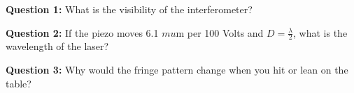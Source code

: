 \textbf{Question 1:}
	\indent What is the visibility of the interferometer?
	
\textbf{Question 2:}
	\indent If the piezo moves 6.1 $mu$m per 100 Volts and $D=\frac{\lambda}{2}$, what is the wavelength of the laser?
	
\textbf{Question 3:}
	\indent Why would the fringe pattern change when you hit or lean on the table?

